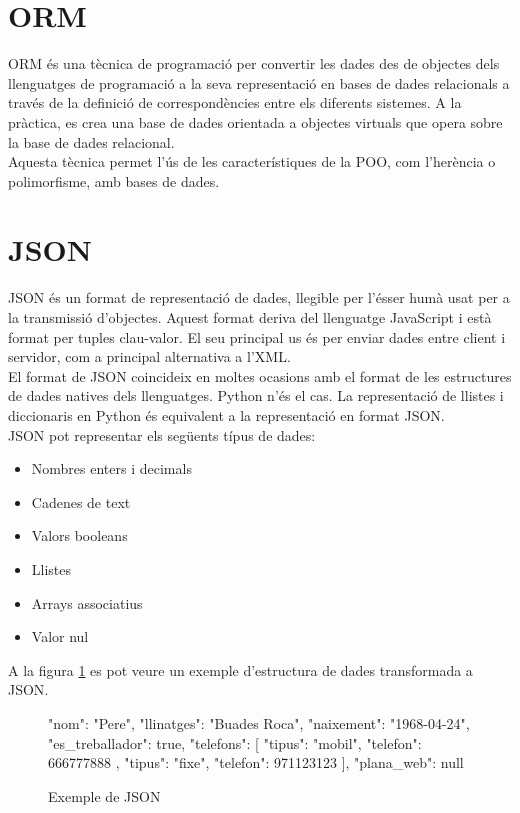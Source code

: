 \section{\ac{ORM}}
\ac{ORM} és una tècnica de programació per convertir les dades des de objectes dels llenguatges de programació a la seva representació en bases de dades relacionals a través de la definició de correspondències entre els diferents sistemes. A la pràctica, es crea una base de dades orientada a objectes virtuals que opera sobre la base de dades relacional.\\

Aquesta tècnica permet l'ús de les característiques de la \ac{POO}, com l'herència o polimorfisme,  amb bases de dades.

\section{\ac{JSON}}
\ac{JSON} és un format de representació de dades, llegible per l'ésser humà usat per a la transmissió d'objectes. Aquest format deriva del llenguatge JavaScript i està format per tuples clau-valor. El seu principal us és per enviar dades entre client i servidor, com a principal alternativa a l'\ac{XML}.\\


El format de \ac{JSON} coincideix en moltes ocasions amb el format de les estructures de dades natives dels llenguatges. Python n'és el cas. La representació de llistes i diccionaris en Python és equivalent a la representació en format \ac{JSON}.\\

\ac{JSON} pot representar els següents típus de dades:

\begin{itemize}
	\item Nombres enters i decimals
	\item Cadenes de text
	\item Valors booleans
	\item Llistes
	\item Arrays associatius
	\item Valor nul
\end{itemize}

A la figura \ref{fig:json_exemple} es pot veure un exemple d'estructura de dades transformada a \ac{JSON}.

\begin{figure}[h!]
	\begin{python}
{
	"nom": "Pere",
	"llinatges": "Buades Roca",
	"naixement": "1968-04-24",
	"es_treballador": true, 
	"telefons": [
		{
			"tipus": "mobil",
			"telefon": 666777888
		},
		{
			"tipus": "fixe",
			"telefon": 971123123
		}
	],
	"plana_web": null
}
	\end{python}
	\caption{Exemple de \ac{JSON}}
	\label{fig:json_exemple}
\end{figure}
